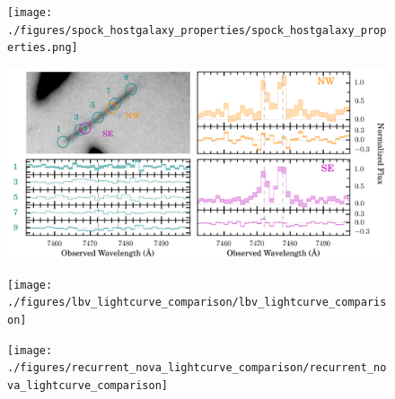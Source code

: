 \begin{figure}[tbp]
  \begin{center}
    \texttt{[image: ./figures/spock\_hostgalaxy\_properties/spock\_hostgalaxy\_properties.png]}
    \caption{\protect}
  \end{center}
\end{figure}

\begin{figure}[tbp]
  \begin{center}
    \includegraphics[width=\textwidth]{./figures/muse_oii_sequence/muse_oii_sequence}
    \caption{\protect}
  \end{center}
\end{figure}

\begin{figure}[tbp]
  \begin{center}
    \texttt{[image: ./figures/lbv\_lightcurve\_comparison/lbv\_lightcurve\_comparison]}
    \caption{\protect}
  \end{center}
\end{figure}

\begin{figure}[tbp]
  \begin{center}
    \texttt{[image: ./figures/recurrent\_nova\_lightcurve\_comparison/recurrent\_nova\_lightcurve\_comparison]}
    \caption{\protect}
  \end{center}
\end{figure}

